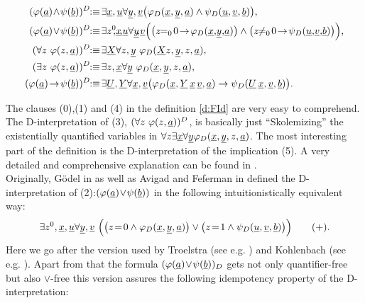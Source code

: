 \begin{dfn}[G\"odel '41]
\begin{enumerate}
\begin{align}
(\phi(\tup a)\!\wedge\!\psi(\tup b))^D\!\!&:\equiv\!
  \exists \tup x, \tup u\forall \tup y, \tup v
  \big(\phi_D(\tup x,\tup y,\tup{a}) \wedge \psi_D(\tup u,\tup v, \tup{b})\big)\text{,}\\
(\phi(\tup a)\!\vee\!\psi(\tup b))^D\!\!&:\equiv\!
  \exists z^0\!\!,\! \tup x\!,\! \tup u\forall \tup y\!,\! \tup v
  \Big( \big(z\!\!=_0\!0\!\rightarrow\!\phi_D(\tup x,\! \tup y,\!\tup{a})\big) \wedge 
    \big(z\!\!\neq_0\!0\!\rightarrow\!\psi_D(\tup u,\!\tup v,\!\tup{b})\big)  \Big)\text{,}\\
(\forall z\ \phi(z,\tup a))^D\!\!&:\equiv\!
  \exists \tup X \forall z,\tup y\ \phi_D(\tup X z,\tup y, z, \tup{a})\text{,}\\
(\exists z\ \phi(z,\tup a))^D\!\!&:\equiv\!
  \exists z,\tup x \forall \tup y\ \phi_D(\tup x,\tup y, z, \tup{a})\text{,}\\
(\phi(\tup a)\!\rightarrow\!\psi(\tup b))^D\!\!&:\equiv\!
  \exists \tup U,\tup Y \forall \tup x, \tup v
  \big(\phi_D(\tup x,\tup Y\atup x\atup v,\tup{a}) \rightarrow 
   \psi_D(\tup U\atup x,\tup v, \tup{b})\big)\text{.}
\end{align}
\end{enumerate}
\end{dfn}
The clauses (0),(1) and (4) in the definition \ref{d:FId} are
very easy to comprehend.
The D-interpretation of (3), $(\forall z\ \varphi(z,\underline a))^D$,
is basically just ``Skolemizing'' the existentially quantified variables in 
$\forall z\exists\underline x\forall\underline y \varphi_D(\underline x, \underline y, z,\underline{a})$.
The most interesting part of the definition is the D-inter\-pre\-ta\-tion 
of the implication (5). A very detailed and comprehensive explanation
can be found in \cite{Kohlenbach08}.\\
Originally, G\"odel in \cite{Goedel58} as well as Avigad and 
Feferman in \cite{AF98} defined the D-inter\-pre\-ta\-tion  of 
(2):$(\varphi(\underline a)\!\vee\!\psi(\underline b))$ in the following intuitionistically
equivalent way:
\[  \exists z^0,\tup x,\tup u\forall \tup y,\tup v\ 
  \Big( \big(z\!=\!0\wedge\phi_D(\tup x, \tup y,\tup{a})\big) \vee 
  \big(z\!=\!1\wedge\psi_D(\tup u,\tup v,\tup{b})\big)\Big) \tag{+} \text{.}\]
Here we go after the version used by Troelstra (see e.g. 
\cite{Troelstra73}) and Kohlenbach (see e.g. \cite{Kohlenbach08}).
Apart from that the formula $(\varphi(\underline a)\!\vee\!\psi(\underline b))_D$ gets not 
only quantifier-free but also $\vee$-free this version
assures the following idempotency property of the D-interpretation:
